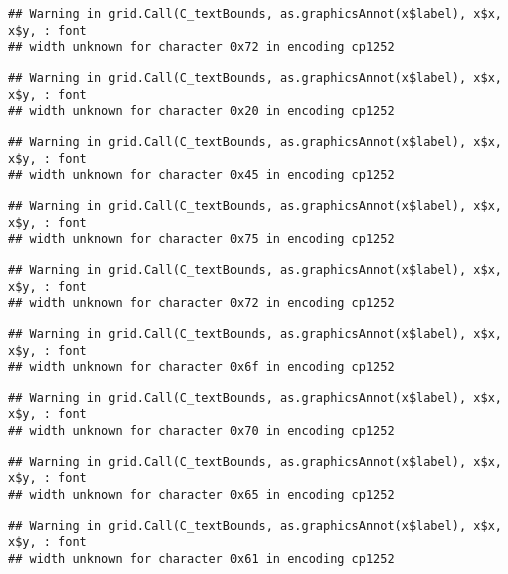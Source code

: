 \documentclass[
]{article}
\begin{document}
\begin{verbatim}
## Warning in grid.Call(C_textBounds, as.graphicsAnnot(x$label), x$x, x$y, : font
## width unknown for character 0x72 in encoding cp1252
\end{verbatim}

\begin{verbatim}
## Warning in grid.Call(C_textBounds, as.graphicsAnnot(x$label), x$x, x$y, : font
## width unknown for character 0x20 in encoding cp1252
\end{verbatim}

\begin{verbatim}
## Warning in grid.Call(C_textBounds, as.graphicsAnnot(x$label), x$x, x$y, : font
## width unknown for character 0x45 in encoding cp1252
\end{verbatim}

\begin{verbatim}
## Warning in grid.Call(C_textBounds, as.graphicsAnnot(x$label), x$x, x$y, : font
## width unknown for character 0x75 in encoding cp1252
\end{verbatim}

\begin{verbatim}
## Warning in grid.Call(C_textBounds, as.graphicsAnnot(x$label), x$x, x$y, : font
## width unknown for character 0x72 in encoding cp1252
\end{verbatim}

\begin{verbatim}
## Warning in grid.Call(C_textBounds, as.graphicsAnnot(x$label), x$x, x$y, : font
## width unknown for character 0x6f in encoding cp1252
\end{verbatim}

\begin{verbatim}
## Warning in grid.Call(C_textBounds, as.graphicsAnnot(x$label), x$x, x$y, : font
## width unknown for character 0x70 in encoding cp1252
\end{verbatim}

\begin{verbatim}
## Warning in grid.Call(C_textBounds, as.graphicsAnnot(x$label), x$x, x$y, : font
## width unknown for character 0x65 in encoding cp1252
\end{verbatim}

\begin{verbatim}
## Warning in grid.Call(C_textBounds, as.graphicsAnnot(x$label), x$x, x$y, : font
## width unknown for character 0x61 in encoding cp1252
\end{verbatim}
\end{document}
